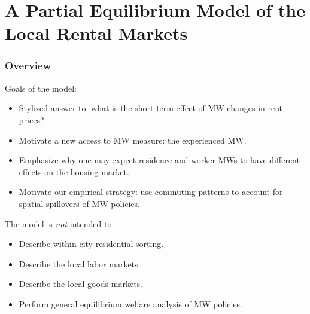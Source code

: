 \documentclass[aspectratio=169, t]{beamer}
\begin{document}
\section{A Partial Equilibrium Model of the Local Rental Markets}

\begin{frame}
    \frametitle{Overview}
    
    	Goals of the model:
	\begin{itemize}
		\item Stylized answer to: what is the short-term effect of MW changes in rent prices?
		\item Motivate a new access to MW measure: the experienced MW.
		\item Emphasize why one may expect residence and worker MWs to have different effects on the housing market.
		\item Motivate our empirical strategy: use commuting patterns to account for spatial
		spillovers of MW policies.
	\end{itemize}
	
	\pause
	\vspace{2mm}
	The model is \textit{not} intended to:
	\begin{itemize}
		\item Describe within-city residential sorting.
		\item Describe the local labor markets.
		\item Describe the local goods markets.
		\item Perform general equilibrium welfare analysis of MW policies.
	\end{itemize}
\end{frame}
\end{document}
